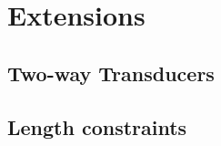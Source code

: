 
\section{Extensions}\label{sec-ext}

\subsection{Two-way Transducers}

\subsection{Length constraints}